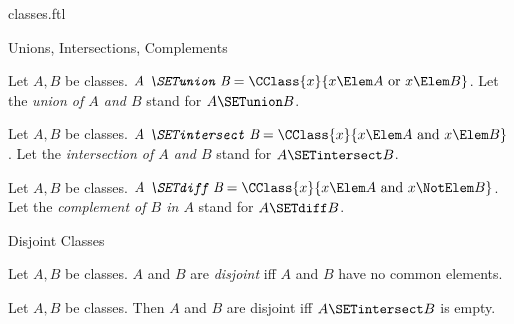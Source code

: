 \documentclass{stex}
\begin{document}
\begin{smodule}{classes.ftl}
\begin{sfragment}{Unions, Intersections, Complements}
  \begin{definition}[forthel]
    Let $A, B$ be classes.
    $\emph{A \SETunion B} = \CClass{x}{x \Elem A\text{ or }x \Elem B}$.
    Let the \emph{union of $A$ and $B$} stand for $A \SETunion B$.
  \end{definition}

  \begin{definition}[forthel]
    Let $A, B$ be classes.
    $\emph{A \SETintersect B} = \CClass{x}{x \Elem A\text{ and }x \Elem B}$.
    Let the \emph{intersection of $A$ and $B$} stand for $A \SETintersect B$.
  \end{definition}

  \begin{definition}[forthel]
    Let $A, B$ be classes.
    $\emph{A \SETdiff B} = \CClass{x}{x \Elem A\text{ and }x \NotElem B}$.
    Let the \emph{complement of $B$ in $A$} stand for $A \SETdiff B$.
  \end{definition}
\end{sfragment}

\begin{sfragment}{Disjoint Classes}
  \begin{definition}[forthel]
    Let $A, B$ be classes.
    $A$ and $B$ are \emph{disjoint} iff $A$ and $B$ have no common elements.
  \end{definition}

  \begin{proposition}[forthel]
    Let $A, B$ be classes.
    Then $A$ and $B$ are disjoint iff $A \SETintersect B$ is empty.
  \end{proposition}
\end{sfragment}
\end{smodule}
\end{document}

